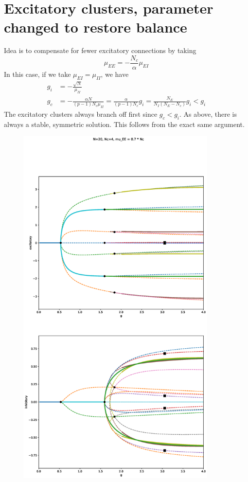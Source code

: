 \documentclass[11pt,reqno]{amsart}
\begin{document}
\section{Excitatory clusters, parameter changed to restore balance}
Idea is to compensate for fewer excitatory connections by taking
\[
\mu_{EE} = -\frac{N_c}{\alpha} \mu_{EI}
\]
In this case, if we take $\mu_{EI} = \mu_{II}$, we have
\begin{align*}
g_i &= -\frac{\sqrt{N}}{\mu_{II}} \\
g_c &= -\frac{\alpha N}{(p-1)N_c \mu_{II}} 
= \frac{\alpha}{(p-1)N_c} g_i = 
\frac{N_E}{N_I( N_E - N_c)} g_i < g_i
\end{align*}
The excitatory clusters always branch off first since $g_c < g_i$. As above, there is always a stable, symmetric solution. This follows from the exact same argument.

\begin{figure}[H]
\centering
\includegraphics[width=10cm]{images/BD4a_c20.eps}
\end{figure}
\end{document}
